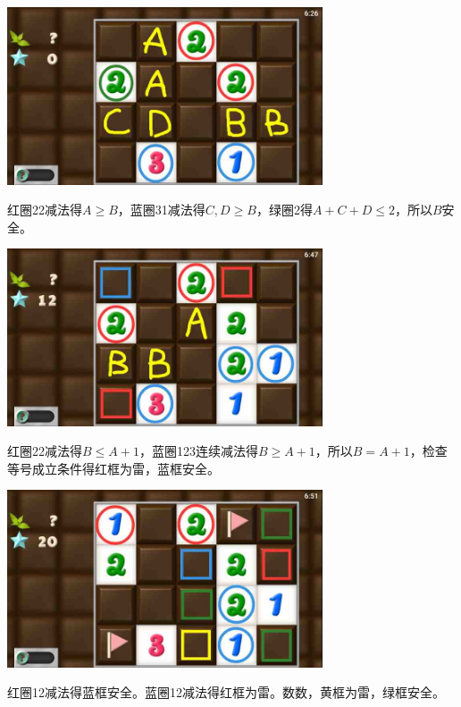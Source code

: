 \subsection{} %
\begin{center}
    \includegraphics[width=0.7\textwidth]{puzzlelow/195-1.jpg}
\end{center}
红圈22减法得$A\ge B$，蓝圈31减法得$C,D\ge B$，绿圈2得$A+C+D\le 2$，所以$B$安全。
\begin{center}
    \includegraphics[width=0.7\textwidth]{puzzlelow/195-2.jpg}
\end{center}
红圈22减法得$B\le A+1$，蓝圈123连续减法得$B\ge A+1$，所以$B=A+1$，检查等号成立条件得红框为雷，蓝框安全。
\begin{center}
    \includegraphics[width=0.7\textwidth]{puzzlelow/195-3.jpg}
\end{center}
红圈12减法得蓝框安全。蓝圈12减法得红框为雷。数数，黄框为雷，绿框安全。


